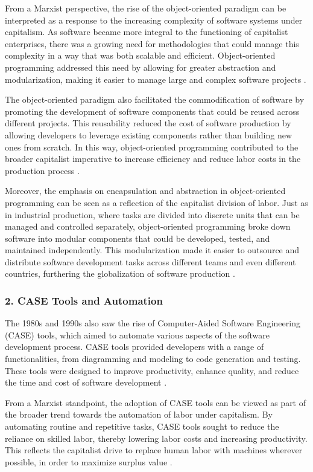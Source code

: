 \begin{refsection}
\begin{multicols}{2}
{From a Marxist perspective, the rise of the object-oriented paradigm can be interpreted as a response to the increasing complexity of software systems under capitalism. As software became more integral to the functioning of capitalist enterprises, there was a growing need for methodologies that could manage this complexity in a way that was both scalable and efficient. Object-oriented programming addressed this need by allowing for greater abstraction and modularization, making it easier to manage large and complex software projects \cite{harvey1989condition}.

The object-oriented paradigm also facilitated the commodification of software by promoting the development of software components that could be reused across different projects. This reusability reduced the cost of software production by allowing developers to leverage existing components rather than building new ones from scratch. In this way, object-oriented programming contributed to the broader capitalist imperative to increase efficiency and reduce labor costs in the production process \cite{marx1867capital}.

Moreover, the emphasis on encapsulation and abstraction in object-oriented programming can be seen as a reflection of the capitalist division of labor. Just as in industrial production, where tasks are divided into discrete units that can be managed and controlled separately, object-oriented programming broke down software into modular components that could be developed, tested, and maintained independently. This modularization made it easier to outsource and distribute software development tasks across different teams and even different countries, furthering the globalization of software production \cite{fuchs2014digital}.

\subsubsection*{2. CASE Tools and Automation}

The 1980s and 1990s also saw the rise of Computer-Aided Software Engineering (CASE) tools, which aimed to automate various aspects of the software development process. CASE tools provided developers with a range of functionalities, from diagramming and modeling to code generation and testing. These tools were designed to improve productivity, enhance quality, and reduce the time and cost of software development \cite{pressman1987software}.

From a Marxist standpoint, the adoption of CASE tools can be viewed as part of the broader trend towards the automation of labor under capitalism. By automating routine and repetitive tasks, CASE tools sought to reduce the reliance on skilled labor, thereby lowering labor costs and increasing productivity. This reflects the capitalist drive to replace human labor with machines wherever possible, in order to maximize surplus value \cite{marx1867capital}.

}
\end{multicols}
\end{refsection}

